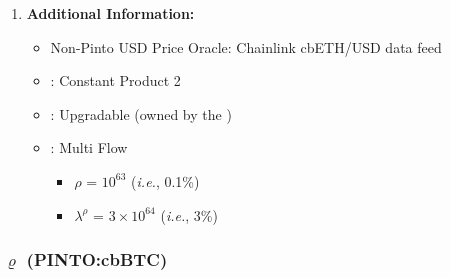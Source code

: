 \documentclass[class=article, crop=false]{standalone}
\begin{document}
\begin{enumerate}
    \item \textbf{Additional Information:}
        \begin{itemize}
            \item Non-Pinto USD Price Oracle: Chainlink cbETH/USD data feed
            \item {}: Constant Product 2
            \item {}: Upgradable  (owned by the )
            \item {}: Multi Flow
                \begin{itemize}
                    \item $\rho$ = $10^{63}$ (\textit{i.e.}, 0.1\%)
                    \item $\lambda^{\rho}$ = $3 \times 10^{64}$ (\textit{i.e.}, 3\%)
                \end{itemize}
        \end{itemize}

\end{enumerate}


\subsubsection{$\varrho$ (PINTO:cbBTC)}
\end{document}
